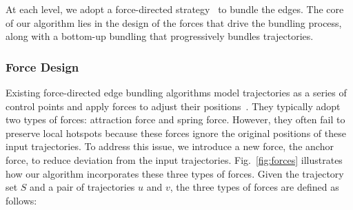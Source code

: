 At each level, we adopt a force-directed strategy~\cite{holten2009force, selassie2011divided} to bundle the edges.
The core of our algorithm lies in the design of the forces that drive the bundling process, along with a bottom-up bundling that progressively bundles trajectories.

\subsubsection{Force Design}
Existing force-directed edge bundling algorithms model trajectories as a series of control points and apply forces to adjust their positions~\cite{holten2009force,selassie2011divided}.
They typically adopt two types of forces: attraction force and spring force.
However, they often fail to preserve local hotspots because these forces ignore the original positions of these input trajectories.
To address this issue, we introduce a new force, the anchor force, to reduce deviation from the input trajectories.
Fig.~\ref{fig:forces} illustrates how our algorithm incorporates these three types of forces.
Given the trajectory set $S$ and a pair of trajectories $u$ and $v$, the three types of forces are defined as follows:



